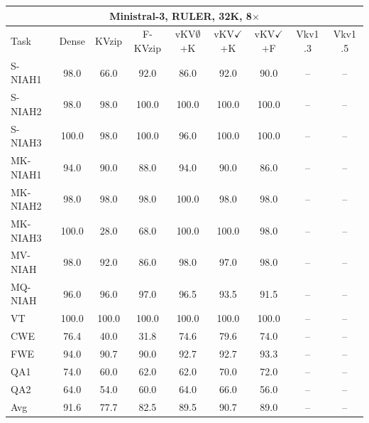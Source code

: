 \begin{tabular}{lcccccccc}
\toprule
\multicolumn{9}{c}{Ministral-3, RULER, 32K, 8$\times$} \\
\midrule
Task & Dense & KVzip & F-KVzip & vKV$\emptyset$+K & vKV$\checkmark$+K & vKV$\checkmark$+F & Vkv1 .3 & Vkv1 .5 \\
\midrule
S-NIAH1 & 98.0 & 66.0 & 92.0 & 86.0 & 92.0 & 90.0 & -- & -- \\
S-NIAH2 & 98.0 & 98.0 & 100.0 & 100.0 & 100.0 & 100.0 & -- & -- \\
S-NIAH3 & 100.0 & 98.0 & 100.0 & 96.0 & 100.0 & 100.0 & -- & -- \\
MK-NIAH1 & 94.0 & 90.0 & 88.0 & 94.0 & 90.0 & 86.0 & -- & -- \\
MK-NIAH2 & 98.0 & 98.0 & 98.0 & 100.0 & 98.0 & 98.0 & -- & -- \\
MK-NIAH3 & 100.0 & 28.0 & 68.0 & 100.0 & 100.0 & 98.0 & -- & -- \\
MV-NIAH & 98.0 & 92.0 & 86.0 & 98.0 & 97.0 & 98.0 & -- & -- \\
MQ-NIAH & 96.0 & 96.0 & 97.0 & 96.5 & 93.5 & 91.5 & -- & -- \\
VT & 100.0 & 100.0 & 100.0 & 100.0 & 100.0 & 100.0 & -- & -- \\
CWE & 76.4 & 40.0 & 31.8 & 74.6 & 79.6 & 74.0 & -- & -- \\
FWE & 94.0 & 90.7 & 90.0 & 92.7 & 92.7 & 93.3 & -- & -- \\
QA1 & 74.0 & 60.0 & 62.0 & 62.0 & 70.0 & 72.0 & -- & -- \\
QA2 & 64.0 & 54.0 & 60.0 & 64.0 & 66.0 & 56.0 & -- & -- \\
\midrule
Avg & 91.6 & 77.7 & 82.5 & 89.5 & 90.7 & 89.0 & -- & -- \\
\bottomrule
\end{tabular}
\vspace{0.8em}

